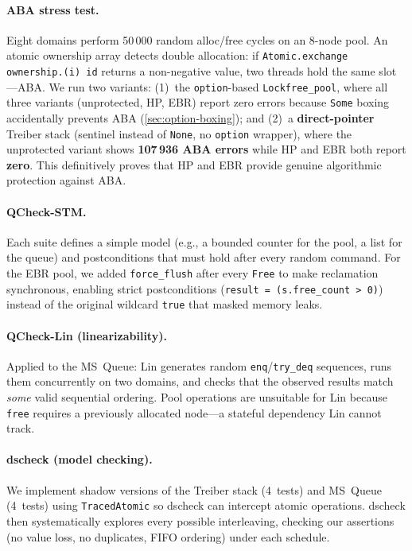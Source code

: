 \documentclass[11pt,a4paper]{article}
\begin{document}
\paragraph{ABA stress test.}
Eight domains perform 50\,000 random alloc/free cycles on an 8-node pool.
An atomic ownership array detects double allocation: if
\lstinline{Atomic.exchange ownership.(i) id} returns a non-negative
value, two threads hold the same slot---ABA.
We run two variants: (1)~the \texttt{option}-based \texttt{Lockfree\_pool},
where all three variants (unprotected, HP, EBR) report zero errors because
\lstinline{Some} boxing accidentally prevents ABA
(\cref{sec:option-boxing}); and (2)~a \textbf{direct-pointer} Treiber stack
(sentinel instead of \lstinline{None}, no \lstinline{option} wrapper),
where the unprotected variant shows \textbf{107\,936 ABA errors} while HP
and EBR both report \textbf{zero}.  This definitively proves that HP and EBR
provide genuine algorithmic protection against ABA.

\paragraph{QCheck-STM.}
Each suite defines a simple model (e.g., a bounded counter for the pool, a
list for the queue) and postconditions that must hold after every random
command.  For the EBR pool, we added \texttt{force\_flush} after every
\texttt{Free} to make reclamation synchronous, enabling strict postconditions
(\lstinline{result = (s.free_count > 0)}) instead of the original wildcard
\lstinline{true} that masked memory leaks.

\paragraph{QCheck-Lin (linearizability).}
Applied to the MS~Queue: Lin generates random \texttt{enq}/\texttt{try\_deq}
sequences, runs them concurrently on two domains, and checks that the
observed results match \emph{some} valid sequential ordering.  Pool operations
are unsuitable for Lin because \texttt{free} requires a previously allocated
node---a stateful dependency Lin cannot track.

\paragraph{dscheck (model checking).}
We implement shadow versions of the Treiber stack (4~tests) and MS~Queue
(4~tests) using \texttt{TracedAtomic} so dscheck can intercept atomic
operations.  dscheck then systematically explores every possible interleaving,
checking our assertions (no value loss, no duplicates, FIFO ordering) under
each schedule.
\end{document}
